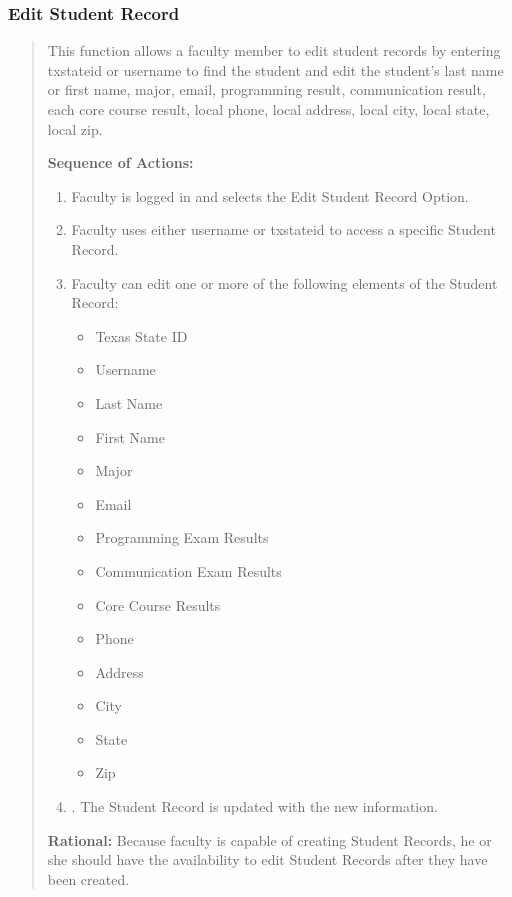    \subsubsection{Edit Student Record} 
   \begin{quote} %
         This function allows a faculty member to edit student records by
         entering txstateid or username to find the student and edit the
         student's last name or first name, major, email, programming result,
         communication result, each core course result, local phone, local
         address, local city, local state, local zip.
         
         \textbf{Sequence of Actions:}
         \begin{enumerate}
            \item Faculty is logged in and selects the Edit Student Record Option.
            \item Faculty uses either username or txstateid to access a specific
               Student Record.
            \item Faculty can edit one or more of the following elements of the
               Student Record:
               \begin{itemize}
                  \item Texas State ID
                  \item Username
                  \item Last Name
                  \item First Name
                  \item Major
                  \item Email
                  \item Programming Exam Results
                  \item Communication Exam Results
                  \item Core Course Results
                  \item Phone
                  \item Address
                  \item City
                  \item State
                  \item Zip
               \end{itemize}
            \item. The Student Record is updated with the new information.
      \end{enumerate}

         \textbf{Rational:}
         Because faculty is capable of creating Student Records, he or she
         should have the availability to edit Student Records after they have
         been created.
   \end{quote} %

